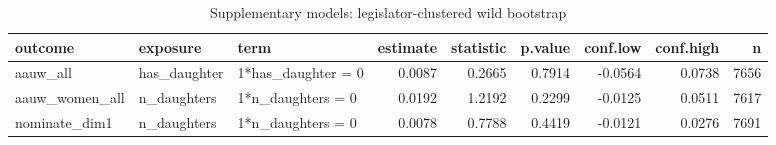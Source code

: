 \begin{table}

\caption{Supplementary models: legislator-clustered wild bootstrap}
\centering
\begin{tabular}[t]{lllrrrrrr}
\toprule
outcome & exposure & term & estimate & statistic & p.value & conf.low & conf.high & n\\
\midrule
aauw\_all & has\_daughter & 1*has\_daughter = 0 & 0.0087 & 0.2665 & 0.7914 & -0.0564 & 0.0738 & 7656\\
aauw\_women\_all & n\_daughters & 1*n\_daughters = 0 & 0.0192 & 1.2192 & 0.2299 & -0.0125 & 0.0511 & 7617\\
nominate\_dim1 & n\_daughters & 1*n\_daughters = 0 & 0.0078 & 0.7788 & 0.4419 & -0.0121 & 0.0276 & 7691\\
\bottomrule
\end{tabular}
\end{table}
